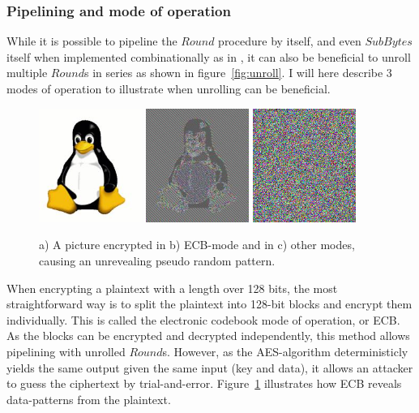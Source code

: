 \subsubsection{Pipelining and mode of operation}

While it is possible to pipeline the $Round$ procedure by itself, and
even $SubBytes$ itself when implemented combinationally as in
\cite{csbox}, it can also be beneficial to unroll multiple $Round$s in
series as shown in figure~\ref{fig:unroll}. I will here describe 3
modes of operation to illustrate when unrolling can be beneficial.

\begin{figure}[htbb]
  \subfigure{\label{fig:ecbpicta}}
  \includegraphics[width=0.3\textwidth]{tux.jpeg}
  \subfigure{\label{fig:ecbpictb}}
  \includegraphics[width=0.3\textwidth]{tux_ecb.jpeg}
  \subfigure{\label{fig:ecbpictc}}
  \includegraphics[width=0.3\textwidth]{noise.png}
  \caption{a) A picture encrypted in b) ECB-mode and in c) other
    modes, causing an unrevealing pseudo random pattern.}
  \label{fig:ecbpict}
\end{figure}

When encrypting a plaintext with a length over 128 bits, the most
straightforward way is to split the plaintext into 128-bit blocks and
encrypt them individually. This is called the electronic codebook mode
of operation, or ECB. As the blocks can be encrypted and decrypted
independently, this method allows pipelining with unrolled
$Round$s. However, as the AES-algorithm deterministicly yields the
same output given the same input (key and data), it allows an attacker
to guess the ciphertext by trial-and-error. Figure~\ref{fig:ecbpict}
illustrates how ECB reveals data-patterns from the plaintext.

